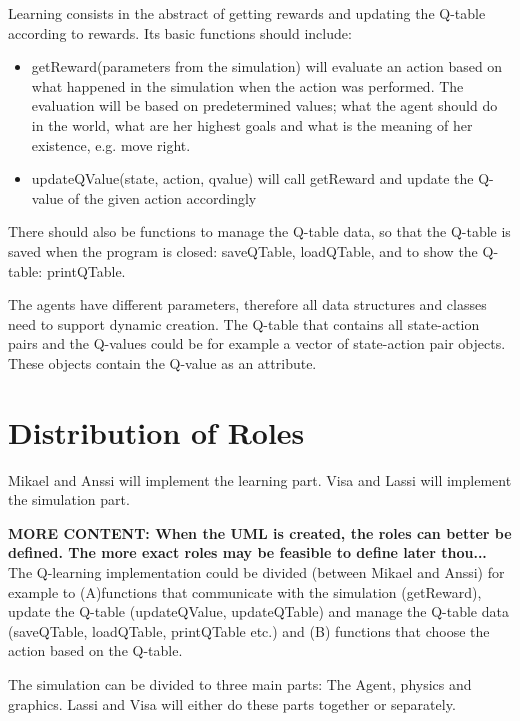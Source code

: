 \documentclass{article}
\begin{document}
Learning consists in the abstract of getting rewards and updating the Q-table
according to rewards. Its basic functions should include:
\begin{itemize}
  \item getReward(parameters from the simulation) will evaluate an action based
  on what happened in the simulation when the action was performed. The evaluation
  will be based on predetermined values; what the agent should do in the world,
  what are her highest goals and what is the meaning of her existence, e.g. move
  right.
  \item updateQValue(state, action, qvalue) will call getReward and update the
  Q-value of the given action accordingly
\end{itemize}

There should also be functions to manage the Q-table data, so that the Q-table is
saved when the program is closed: saveQTable, loadQTable, and to show the Q-table:
printQTable.

The agents have different parameters, therefore all data structures and classes
need to support dynamic creation. The Q-table that contains all state-action pairs
and the Q-values could be for example a vector of state-action pair objects. These
objects contain the Q-value as an attribute.



\section{Distribution of Roles}
Mikael and Anssi will implement the learning part.
Visa and Lassi will implement the simulation part.

\textbf{MORE CONTENT: When the UML is created, the roles can better be defined.
  The more exact roles may be feasible to define later thou...}
The Q-learning implementation could be divided (between Mikael and Anssi) for
example to (A)functions that communicate with the simulation (getReward), update
the Q-table (updateQValue, updateQTable) and manage the Q-table data (saveQTable,
loadQTable, printQTable etc.) and (B) functions that choose the action based on
the Q-table.

The simulation can be divided to three main parts: The Agent, physics and graphics.
Lassi and Visa will either do these parts together or separately.
\end{document}
